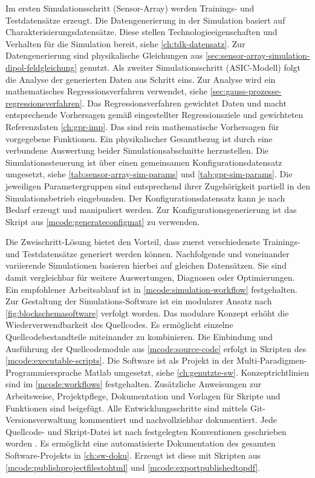 Im ersten Simulationsschritt (Sensor-Array) werden Trainings- und Testdatensätze erzeugt. Die Datengenerierung in der Simulation basiert auf Charakterisierungsdatensätze. Diese stellen Technologieeigenschaften und Verhalten für die Simulation bereit, siehe \autoref{ch:tdk-datensatz}. Zur Datengenerierung sind physikalische Gleichungen aus \autoref{sec:sensor-array-simulation-dipol-feldgleichung} genutzt. Als zweiter Simulationsschritt (ASIC-Modell) folgt die Analyse der generierten Daten aus Schritt eins. Zur Analyse wird ein mathematisches Regressionsverfahren verwendet, siehe \autoref{sec:gauss-prozesse-regressionsverfahren}. Das Regressionsverfahren gewichtet Daten und macht entsprechende Vorhersagen gemäß eingestellter Regressionsziele und gewichteten Referenzdaten \autoref{ch:gpr-imp}. Das sind rein mathematische Vorhersagen für vorgegebene Funktionen. Ein physikalischer Gesamtbezug ist durch eine verbundene Auswertung beider Simulationsabschnitte herzustellen. Die Simulationssteuerung ist über einen gemeinsamen Konfigurationsdatensatz umgesetzt, siehe \autoref{tab:sensor-array-sim-params} und \autoref{tab:gpr-sim-params}. Die jeweiligen Parametergruppen sind entsprechend ihrer Zugehörigkeit partiell in den Simulationsbetrieb eingebunden. Der Konfigurationsdatensatz kann je nach Bedarf erzeugt und manipuliert werden. Zur Konfigurationsgenerierung ist das Skript aus \autoref{mcode:generateconfigmat} zu verwenden.


\clearpage


Die Zweischritt-Lösung bietet den Vorteil, dass zuerst verschiedenste Trainings- und Testdatensätze generiert werden können. Nachfolgende und voneinander variierende Simulationen basieren hierbei auf gleichen Datensätzen. Sie sind damit vergleichbar für weitere Auswertungen, Diagnosen oder Optimierungen. Ein empfohlener Arbeitsablauf ist in \autoref{mcode:simulation-workflow} festgehalten.
\newline
Zur Gestaltung der Simulations-Software ist ein modularer Ansatz nach \autoref{fig:blockschemasoftware} verfolgt worden. Das modulare Konzept erhöht die Wiederverwendbarkeit des Quellcodes. Es ermöglicht einzelne Quellcodebestandteile miteinander zu kombinieren. Die Einbindung und Ausführung der Quellcodemodule aus \autoref{mcode:source-code} erfolgt in Skripten des \autoref{mcode:executable-scripts}. Die Software ist als Projekt in der Multi-Paradigmen-Programmiersprache Matlab umgesetzt, siehe \autoref{ch:genutzte-sw}. Konzeptrichtlinien sind im \autoref{mcode:workflows} festgehalten. Zusätzliche Anweisungen zur Arbeitsweise, Projektpflege, Dokumentation und Vorlagen für Skripte und Funktionen sind beigefügt. Alle Entwicklungsschritte sind mittels Git-Versionsverwaltung kommentiert und nachvollziehbar dokumentiert. Jede Quellcode- und Skript-Datei ist nach festgelegten Konventionen geschrieben worden \cite{Johnson2014}. Es ermöglicht eine automatisierte Dokumentation des gesamten Software-Projekts in \autoref{ch:sw-doku}. Erzeugt ist diese mit Skripten aus \autoref{mcode:publishprojectfilestohtml} und \autoref{mcode:exportpublishedtopdf}.


